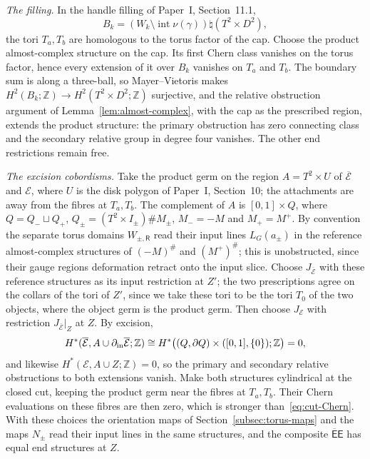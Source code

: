 \documentclass[11pt]{amsart}
\theoremstyle{definition}
\theoremstyle{remark}
\theoremstyle{plain}
\numberwithin{equation}{section}
\newcommand{\ZZ}{\mathbb Z}
\begin{document}
\emph{The filling.} In the handle filling of Paper~I, Section~11.1,
\[
 B_k=(W_k\setminus\operatorname{int}\nu(\gamma))\natural(T^2\times D^2),
\]
the tori $T_a,T_b$ are homologous to the torus factor of the cap. Choose
the product almost-complex structure on the cap. Its first Chern class
vanishes on the torus factor, hence every extension of it over $B_k$
vanishes on $T_a$ and $T_b$. The boundary sum is along a three-ball, so
Mayer--Vietoris makes $H^2(B_k;\ZZ)\to H^2(T^2\times D^2;\ZZ)$ surjective,
and the relative obstruction argument of Lemma~\ref{lem:almost-complex},
with the cap as the prescribed region, extends the product structure: the
primary obstruction has zero connecting class and the secondary relative
group in degree four vanishes. The other end restrictions remain free.

\emph{The excision cobordisms.} Take the product germ on the region
$A=T^2\times U$ of $\overline{\mathcal E}$ and $\mathcal E$, where $U$ is the
disk polygon of Paper~I, Section~10; the attachments are away from the
fibres at $T_a,T_b$. The complement of $A$ is $[0,1]\times Q$, where
$Q=Q_-\sqcup Q_+$, $Q_\pm=(T^2\times I_\pm)\#M_\pm$, $M_-=-M$ and $M_+=M^+$.
By convention the separate torus domains $W_{\pm,\mathsf R}$ read their
input lines $L_G(a_\pm)$ in the reference almost-complex structures of
$(-M)^\#$ and $(M^+)^\#$; this is unobstructed, since their gauge regions
deformation retract onto the input slice. Choose $J_{\overline{\mathcal E}}$
with these reference structures as its input restriction at $Z'$; the two
prescriptions agree on the collars of the tori of $Z'$, since we take these
tori to be the tori $T_0$ of the two objects, where the object germ is the
product germ. Then choose $J_{\mathcal E}$ with restriction
$J_{\overline{\mathcal E}}|_Z$ at $Z$. By excision,
\[
 H^*(\overline{\mathcal E},A\cup\partial_{\rm in}\overline{\mathcal E};\ZZ)
 \cong H^*\bigl((Q,\partial Q)\times([0,1],\{0\});\ZZ\bigr)=0,
\]
and likewise $H^*(\mathcal E,A\cup Z;\ZZ)=0$, so the primary and secondary
relative obstructions to both extensions vanish. Make both structures
cylindrical at the closed cut, keeping the product germ near the fibres at
$T_a,T_b$. Their Chern evaluations on these fibres are then zero, which is
stronger than~\eqref{eq:cut-Chern}. With these choices the orientation maps
of Section~\ref{subsec:torus-maps} and the maps $N_\pm$ read their input
lines in the same structures, and the composite $\overline{\mathsf E}\mathsf E$
has equal end structures at $Z$.
\end{document}

